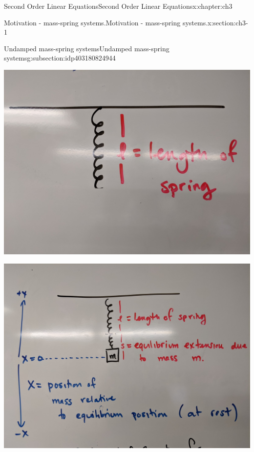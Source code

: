 \documentclass[oneside,10pt,]{book}
\numberwithin{equation}{section}
\numberwithin{equation}{section}
\begin{document}
\begin{chapterptx}{Second Order Linear Equations}{}{Second Order Linear Equations}{}{}{x:chapter:ch3}
\begin{sectionptx}{Motivation - mass-spring systems.}{}{Motivation - mass-spring systems.}{}{}{x:section:ch3-1}
\begin{subsectionptx}{Undamped mass-spring systems}{}{Undamped mass-spring systems}{}{}{g:subsection:idp403180824944}
\begin{image}{0}{1}{0}
\includegraphics[width=\linewidth]{images/spring_no_mass.jpg}
\end{image}%
\begin{image}{0}{1}{0}%
\includegraphics[width=\linewidth]{images/spring_eq.jpg}
\end{image}%
\begin{image}{0}{1}{0}%

\end{image}
\end{subsectionptx}
\end{sectionptx}
\end{chapterptx}
\end{document}
